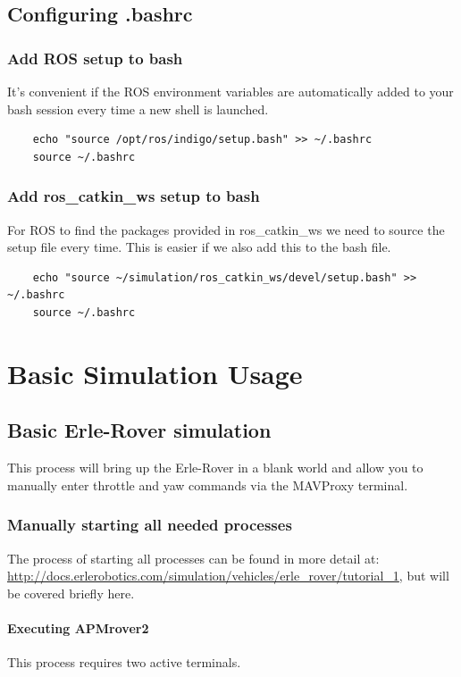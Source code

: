 \documentclass{report}
\begin{document}
\section{Configuring .bashrc}
\subsection{Add ROS setup to bash}
	It's convenient if the ROS environment variables are automatically added to your bash session every time a new shell is launched.
\begin{lstlisting}
	echo "source /opt/ros/indigo/setup.bash" >> ~/.bashrc
	source ~/.bashrc
\end{lstlisting}

\subsection{Add ros\_catkin\_ws setup to bash}
	For ROS to find the packages provided in ros\_catkin\_ws we need to source the setup file every time. This is easier if we also add this to the bash file.
\begin{lstlisting}
	echo "source ~/simulation/ros_catkin_ws/devel/setup.bash" >> ~/.bashrc
	source ~/.bashrc
\end{lstlisting}






\chapter{Basic Simulation Usage}
\section{Basic Erle-Rover simulation}
This process will bring up the Erle-Rover in a blank world and allow you to manually enter throttle and yaw commands via the MAVProxy terminal.
\subsection{Manually starting all needed processes}
The process of starting all processes can be found in more detail at: \\ \href{http://docs.erlerobotics.com/simulation/vehicles/erle_rover/tutorial_1}{http://docs.erlerobotics.com/simulation/vehicles/erle\_rover/tutorial\_1}, but will be covered briefly here.
\subsubsection{Executing APMrover2}\label{MAVmanual}
This process requires two active terminals. 
\end{document}
